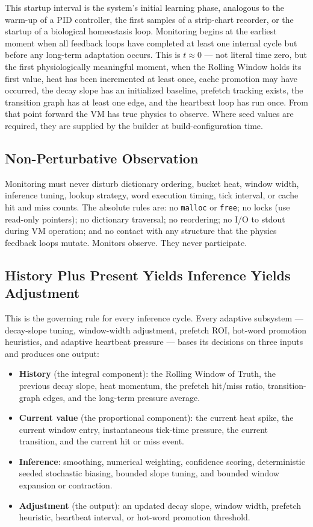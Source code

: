 This startup interval is the system's initial learning phase, analogous to the
warm-up of a PID controller, the first samples of a strip-chart recorder, or the
startup of a biological homeostasis loop. Monitoring begins at the earliest
moment when all feedback loops have completed at least one internal cycle but
before any long-term adaptation occurs. This is $t \approx 0$ --- not literal
time zero, but the first physiologically meaningful moment, when the Rolling
Window holds its first value, heat has been incremented at least once, cache
promotion may have occurred, the decay slope has an initialized baseline,
prefetch tracking exists, the transition graph has at least one edge, and the
heartbeat loop has run once. From that point forward the VM has true physics to
observe. Where seed values are required, they are supplied by the builder at
build-configuration time.

\subsection{Non-Perturbative Observation}

Monitoring must never disturb dictionary ordering, bucket heat, window width,
inference tuning, lookup strategy, word execution timing, tick interval, or
cache hit and miss counts. The absolute rules are: no \texttt{malloc} or
\texttt{free}; no locks (use read-only pointers); no dictionary traversal; no
reordering; no I/O to stdout during VM operation; and no contact with any
structure that the physics feedback loops mutate. Monitors observe. They never
participate.

\subsection{History Plus Present Yields Inference Yields Adjustment}

This is the governing rule for every inference cycle. Every adaptive
subsystem --- decay-slope tuning, window-width adjustment, prefetch ROI,
hot-word promotion heuristics, and adaptive heartbeat pressure --- bases its
decisions on three inputs and produces one output:

\begin{itemize}
  \item \textbf{History} (the integral component): the Rolling Window of Truth,
        the previous decay slope, heat momentum, the prefetch hit/miss ratio,
        transition-graph edges, and the long-term pressure average.
  \item \textbf{Current value} (the proportional component): the current heat
        spike, the current window entry, instantaneous tick-time pressure, the
        current transition, and the current hit or miss event.
  \item \textbf{Inference}: smoothing, numerical weighting, confidence scoring,
        deterministic seeded stochastic biasing, bounded slope tuning, and
        bounded window expansion or contraction.
  \item \textbf{Adjustment} (the output): an updated decay slope, window width,
        prefetch heuristic, heartbeat interval, or hot-word promotion threshold.
\end{itemize}

